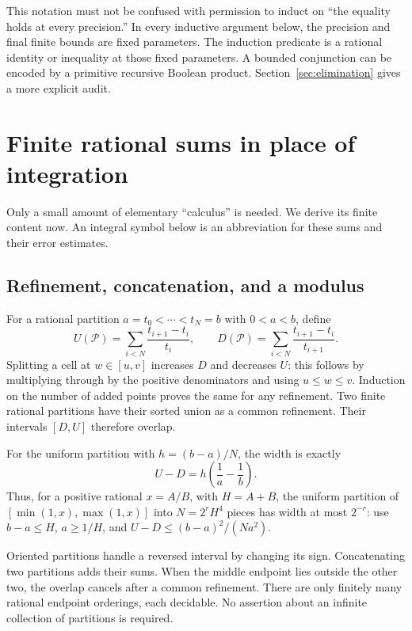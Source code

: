 \documentclass[11pt]{article}
\theoremstyle{definition}
\begin{document}
This notation must not be confused with permission to induct on
``the equality holds at every precision.'' In every inductive argument
below, the precision and final finite bounds are fixed parameters. The
induction predicate is a rational identity or inequality at those fixed
parameters. A bounded conjunction can be encoded by a primitive recursive
Boolean product. Section~\ref{sec:elimination} gives a more explicit audit.

\section{Finite rational sums in place of integration}
\label{sec:sums}

Only a small amount of elementary ``calculus'' is needed. We derive its
finite content now. An integral symbol below is an abbreviation for these
sums and their error estimates.

\subsection{Refinement, concatenation, and a modulus}

For a rational partition $a=t_0<\cdots<t_N=b$ with $0<a<b$, define
\[
 U(\mathcal P)=\sum_{i<N}\frac{t_{i+1}-t_i}{t_i},\qquad
 D(\mathcal P)=\sum_{i<N}\frac{t_{i+1}-t_i}{t_{i+1}}.
\]
Splitting a cell at $w\in[u,v]$ increases $D$ and decreases $U$:
this follows by multiplying through by the positive denominators and
using $u\le w\le v$. Induction on the number of added points proves the
same for any refinement. Two finite rational partitions have their sorted
union as a common refinement. Their intervals $[D,U]$ therefore overlap.

For the uniform partition with $h=(b-a)/N$, the width is exactly
\begin{equation}\label{eq:logwidth}
 U-D=h\left(\frac1a-\frac1b\right).
\end{equation}
Thus, for a positive rational $x=A/B$, with $H=A+B$, the uniform
partition of $[\min(1,x),\max(1,x)]$ into $N=2^rH^4$ pieces has
width at most $2^{-r}$: use $b-a\le H$, $a\ge1/H$, and
$U-D\le(b-a)^2/(Na^2)$.

Oriented partitions handle a reversed interval by changing its sign.
Concatenating two partitions adds their sums. When the middle endpoint
lies outside the other two, the overlap cancels after a common refinement.
There are only finitely many rational endpoint orderings, each decidable.
No assertion about an infinite collection of partitions is required.
\end{document}
